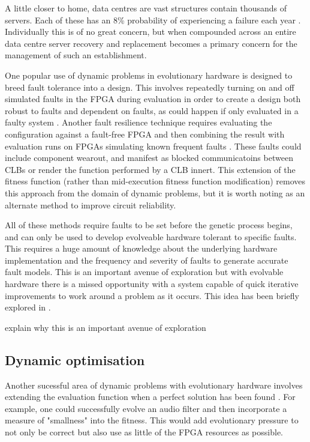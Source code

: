 A little closer to home, data centres are vast structures contain thousands of servers.
Each of these has an 8\% probability of experiencing a failure each year
 \cite{Vishwanath:2010:CCC:1807128.1807161}.
Individually this is of no great concern, but when compounded across an entire data centre
server recovery and replacement becomes a primary concern for the management of
such an establishment.

One popular use of dynamic problems in evolutionary hardware is designed to breed
fault tolerance into a
design. This involves repeatedly turning on and off simulated faults in the FPGA during
evaluation in order to
create a design both robust to faults and dependent on faults, as could happen if
only evaluated in a faulty system \cite{651463}. Another fault resilience
technique requires evaluating the configuration
against a fault-free FPGA and then combining the result with evaluation runs on FPGAs
simulating known frequent faults \cite{651463}\cite{Keymeulen2000}. These faults could include component
wearout, and manifest as blocked communicatoins between CLBs or render the function
performed by a CLB innert. This extension of the fitness function (rather than
mid-execution fitness function modification) removes this approach from the domain of dynamic problems,
but it is worth noting as an alternate method to improve circuit reliability.

All of these methods require faults to be set before the genetic process begins, and can only be used to
develop evolveable hardware tolerant to specific faults. This requires a huge amount of knowledge
about the underlying hardware implementation and the frequency and severity of faults to generate
accurate fault models. This
is an important avenue of exploration but with evolvable hardware there is a missed
opportunity with a system capable of quick iterative improvements to work around
a problem as it occurs. This idea has been briefly explored in \cite{10.1007/3-540-61093-6_6}.

\todo explain why this is an important avenue of exploration

\subsection{Dynamic optimisation}
Another sucessful area of dynamic problems with evolutionary hardware involves
extending the evaluation function when a perfect solution has been found \cite{785435}. For example,
one could successfully evolve an audio filter and then incorporate a measure of "smallness"
into the fitness. This would add evolutionary pressure to not only be correct but also
use as little of the FPGA resources as possible.

